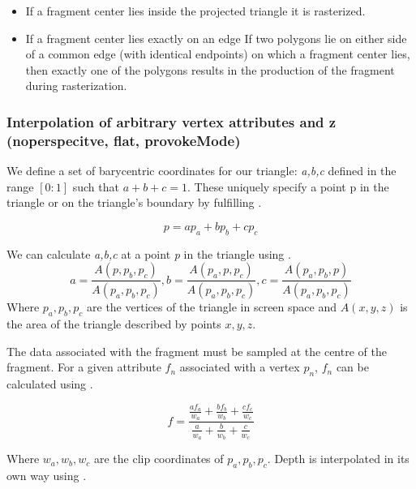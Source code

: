 \begin{itemize}
    \item If a fragment center lies inside the projected triangle it is rasterized.
    \item If a fragment center lies exactly on an edge
    \subitem If two polygons lie on either side of a common edge (with identical endpoints) on which a fragment center lies, then exactly one of the polygons results in the production of the fragment during rasterization.
    \subsubitem {}
\end{itemize}

\subsubsection{Interpolation of arbitrary vertex attributes and z (noperspecitve, flat, provokeMode)}

We define a set of barycentric coordinates for our triangle: \textit{a,b,c} defined in the range $[0:1]$ such that $a + b + c = 1$.
These uniquely specify a point p in the triangle or on the triangle's boundary by fulfilling .

\begin{equation}\label{eqn:pInTermsOfABC}
    p = ap_a + bp_b + cp_c
\end{equation}

We can calculate \textit{a,b,c} at a point \textit{p} in the triangle using .
\begin{equation}\label{eqn:BaryCentricCoordinate}
    a = \frac{A(p,p_b,p_c)}{A(p_a,p_b,p_c)}, b = \frac{A(p_a,p,p_c)}{A(p_a,p_b,p_c)}, c = \frac{A(p_a,p_b,p)}{A(p_a,p_b,p_c)}
\end{equation}
Where $p_a, p_b, p_c$ are the vertices of the triangle in screen space and $A(x,y,z)$ is the area of the triangle described by points $x,y,z$.

The data associated with the fragment must be sampled at the centre of the fragment.
For a given attribute $f_n$ associated with a vertex $p_n$, $f_n$ can be calculated using .

\begin{equation}\label{eqn:InterpolatedAttr}
    f = \frac{\frac{af_a}{w_a}+\frac{bf_b}{w_b}+\frac{cf_c}{w_c}}{\frac{a}{w_a}+\frac{b}{w_b}+\frac{c}{w_c}}
\end{equation}

Where $w_a,w_b,w_c$ are the clip coordinates of $p_a,p_b, p_c$. 
Depth is interpolated in its own way using .

